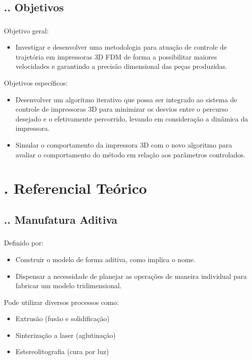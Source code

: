 \documentclass[aspectratio=169]{beamer}
\begin{document}
\subsection{\insertsectionnumber .\insertsubsectionnumber . Objetivos}
\begin{frame}
  \frametitle{\insertsubsection}
  Objetivo geral:
  \begin{itemize}
    \item Investigar e desenvolver uma metodologia para atuação de controle de trajetória em impressoras 3D FDM de forma a possibilitar maiores velocidades e garantindo a precisão dimensional das peças produzidas.
  \end{itemize}
  Objetivos específicos:
  \begin{itemize}
    \item Desenvolver um algoritmo iterativo que possa ser integrado ao sistema de controle de impressoras 3D para minimizar os desvios entre o percurso desejado e o efetivamente percorrido, levando em consideração a dinâmica da impressora.
    \item Simular o comportamento da impressora 3D com o novo algoritmo para avaliar o comportamento do método em relação aos parâmetros controlados.
  \end{itemize}

\end{frame}

\section{\insertsectionnumber . Referencial Teórico}

\subsection{\insertsectionnumber .\insertsubsectionnumber . Manufatura Aditiva}
\begin{frame}
  \frametitle{\insertsubsection}
  Definido por:
  \begin{itemize}
    \item Construir o modelo de forma aditiva, como implica o nome.
    \item Dispensar a necessidade de planejar as operações de maneira individual para fabricar um modelo tridimensional.
  \end{itemize}
  Pode utilizar diversos processos como:
  \begin{itemize}
    \item Extrusão (fusão e solidificação)
    \item Sinterização a laser (aglutinação)
    \item Estereolitografia (cura por luz)
  \end{itemize}
\end{frame}
\end{document}
